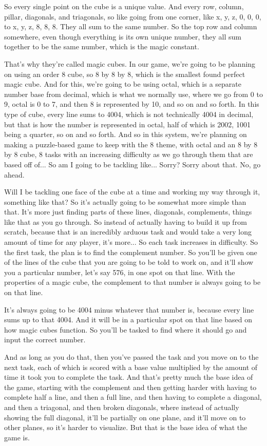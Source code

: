 \documentclass{article}
\begin{document}
So every single point on the cube is a unique value. And every row, column, pillar, diagonals, and
triagonals, so like going from one corner, like x, y, z, 0, 0, 0, to x, y, z, 8, 8, 8. They all sum to the
same number. So the top row and column somewhere, even though everything is its own unique
number, they all sum together to be the same number, which is the magic constant.

That's why they're called magic cubes. In our game, we're going to be planning on using an order
8 cube, so 8 by 8 by 8, which is the smallest found perfect magic cube. And for this, we're going
to be using octal, which is a separate number base from decimal, which is what we normally use,
where we go from 0 to 9, octal is 0 to 7, and then 8 is represented by 10, and so on and so forth.
In this type of cube, every line sums to 4004, which is not technically 4004 in decimal, but that is
how the number is represented in octal, half of which is 2002, 1001 being a quarter, so on and so
forth. And so in this system, we're planning on making a puzzle-based game to keep with the 8
theme, with octal and an 8 by 8 by 8 cube, 8 tasks with an increasing difficulty as we go through
them that are based off of... So am I going to be tackling like... Sorry? Sorry about that. No, go
ahead.

Will I be tackling one face of the cube at a time and working my way through it, something like
that? So it's actually going to be somewhat more simple than that. It's more just finding parts of
these lines, diagonals, complements, things like that as you go through. So instead of actually
having to build it up from scratch, because that is an incredibly arduous task and would take a
very long amount of time for any player, it's more... So each task increases in difficulty.
So the first task, the plan is to find the complement number. So you'll be given one of the lines of
the cube that you are going to be told to work on, and it'll show you a particular number, let's say
576, in one spot on that line. With the properties of a magic cube, the complement to that number
is always going to be on that line.

It's always going to be 4004 minus whatever that number is, because every line sums up to that
4004. And it will be in a particular spot on that line based on how magic cubes function. So you'll
be tasked to find where it should go and input the correct number.

And as long as you do that, then you've passed the task and you move on to the next task, each
of which is scored with a base value multiplied by the amount of time it took you to complete the
task. And that's pretty much the base idea of the game, starting with the complement and then
getting harder with having to complete half a line, and then a full line, and then having to
complete a diagonal, and then a triagonal, and then broken diagonals, where instead of actually
showing the full diagonal, it'll be partially on one plane, and it'll move on to other planes, so it's
harder to visualize. But that is the base idea of what the game is.
\end{document}
